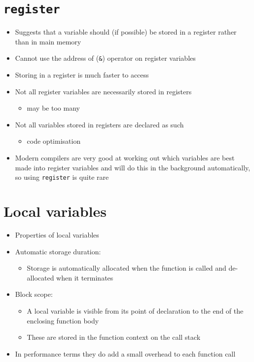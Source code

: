 \documentclass{article}
\begin{document}
\section{\texttt{register}}
\begin{itemize}
\item Suggests that a variable should (if possible) be stored in a register rather than in main memory
\item Cannot use the address of (\verb!&!) operator on register variables
\item Storing in a register is much faster to access
\item Not all register variables are necessarily stored in registers 
\begin{itemize}
\item may be too many
\end{itemize}
\item Not all variables stored in registers are declared as such 
\begin{itemize}
\item code optimisation
\end{itemize}
\item Modern compilers are very good at working out which variables are best made into register variables and will do this in the background automatically, so using \verb!register! is quite rare
\end{itemize}



\section{Local variables}
\begin{itemize}
\item Properties of local variables

\item Automatic storage duration:
\begin{itemize}
\item Storage is automatically allocated when the function is called and de-allocated when it terminates
\end{itemize}

\item Block scope:
\begin{itemize}
\item A local variable is visible from its point of declaration to the end of the enclosing function body
\item These are stored in the function context on the call stack
\end{itemize}
\item In performance terms they do add a small overhead to each function call
\end{itemize}
\end{document}
